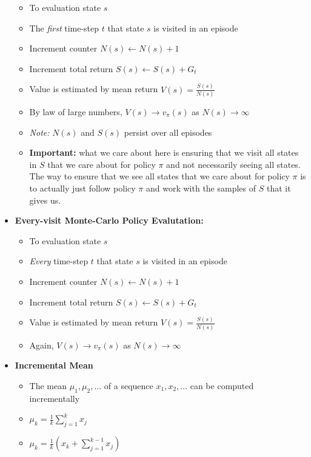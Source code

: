 \documentclass[12pt]{article}
\begin{document}
\begin{itemize}
    \begin{itemize}
      \item To evaluation state $s$
      \item The \textit{first} time-step $t$ that state $s$ is visited in an episode
      \item Increment counter $N(s) \leftarrow N(s) + 1$
      \item Increment total return $S(s) \leftarrow S(s) + G_t$
      \item Value is estimated by mean return $V(s) = \frac{S(s)}{N(s)}$
      \item By law of large numbers, $V(s) \rightarrow v_\pi(s)$ as $N(s) \rightarrow \infty$
      \item \textit{Note:} $N(s)$ and $S(s)$ persist over all episodes
      \item \textbf{Important:} what we care about here is ensuring that we visit all states in $S$
      that we care about for policy $\pi$ and not necessarily seeing all states. The way to ensure that
      we see all states that we care about for policy $\pi$ is to actually just follow policy $\pi$ and work
      with the samples of $S$ that it gives us.
    \end{itemize}
    \item \textbf{Every-visit Monte-Carlo Policy Evalutation:}
    \begin{itemize}
      \item To evaluation state $s$
      \item \textit{Every} time-step $t$ that state $s$ is visited in an episode
      \item Increment counter $N(s) \leftarrow N(s) + 1$
      \item Increment total return $S(s) \leftarrow S(s) + G_t$
      \item Value is estimated by mean return $V(s) = \frac{S(s)}{N(s)}$
      \item Again, $V(s) \rightarrow v_\pi(s)$ as $N(s) \rightarrow \infty$
    \end{itemize}
    \item \textbf{Incremental Mean}
    \begin{itemize}
      \item The mean $\mu_1, \mu_2, \dots$ of a sequence $x_1, x_2, \dots$
      can be computed incrementally
      \item $\mu_k = \frac{1}{k}\sum_{j=1}^{k}x_j$
      \item $\mu_k = \frac{1}{k}(x_k + \sum_{j=1}^{k-1}x_j)$

\end{itemize}
\end{itemize}
\end{document}
